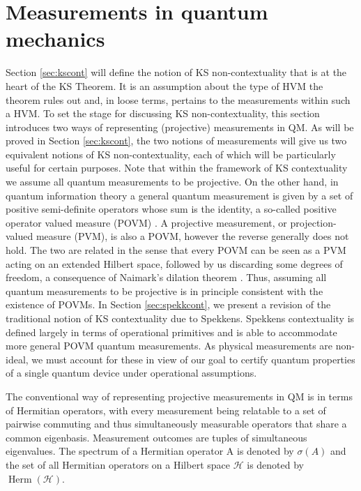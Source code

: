 \section{Measurements in quantum mechanics}
\label{sec:mnts}
Section \ref{sec:kscont} will define the notion of KS non-contextuality that is at the heart of the KS Theorem. It is an assumption about the type of HVM the theorem rules out and, in loose terms, pertains to the measurements within such a HVM. To set the stage for discussing KS non-contextuality, this section introduces two ways of representing (projective) measurements in QM. As will be proved in Section \ref{sec:kscont}, the two notions of measurements will give us two equivalent notions of KS non-contextuality, each of which will be particularly useful for certain purposes. Note that within the framework of KS contextuality we assume all quantum measurements to be projective. On the other hand, in quantum information theory a general quantum measurement is given by a set of positive semi-definite operators whose sum is the identity, a so-called positive operator valued measure (POVM) \cite{Nielsen2010}. A projective measurement, or projection-valued measure (PVM), is also a POVM, however the reverse generally does not hold. The two are related in the sense that every POVM can be seen as a PVM acting on an extended Hilbert space, followed by us discarding some degrees of freedom, a consequence of Naimark's dilation theorem \cite{Watrous2018}. Thus, assuming all quantum measurements to be projective is in principle consistent with the existence of POVMs. In Section \ref{sec:spekkcont}, we present a revision of the traditional notion of KS contextuality due to Spekkens. Spekkens contextuality is defined largely in terms of operational primitives and is able to accommodate more general POVM quantum measurements. As physical measurements are non-ideal, we must account for these in view of our goal to certify quantum properties of a single quantum device under operational assumptions.

The conventional way of representing projective measurements in QM is in terms of Hermitian operators, with every measurement being relatable to a set of pairwise commuting and thus simultaneously measurable operators that share a common eigenbasis. Measurement outcomes are tuples of simultaneous eigenvalues. The spectrum of a Hermitian operator A is denoted by $\sigma(A)$ and the set of all Hermitian operators on a Hilbert space $\mathcal{H}$ is denoted by $\operatorname{Herm}(\mathcal{H})$. 

